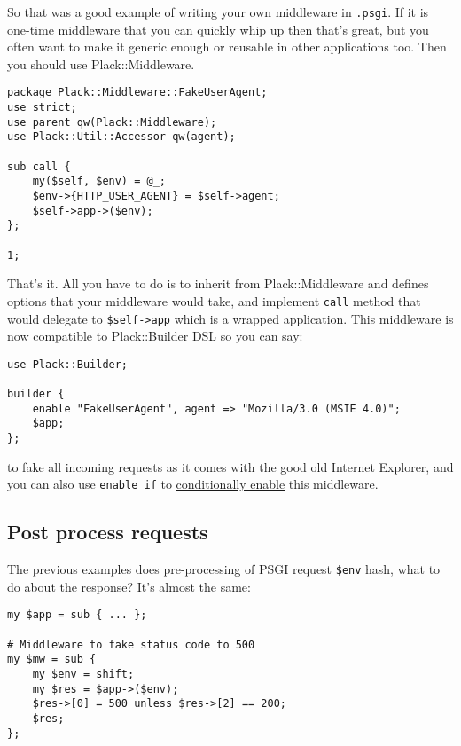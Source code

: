 So that was a good example of writing your own middleware in
\lstinline!.psgi!. If it is one-time middleware that you can quickly
whip up then that's great, but you often want to make it generic enough
or reusable in other applications too. Then you should use
Plack::Middleware.

\begin{lstlisting}
package Plack::Middleware::FakeUserAgent;
use strict;
use parent qw(Plack::Middleware);
use Plack::Util::Accessor qw(agent);

sub call {
    my($self, $env) = @_;
    $env->{HTTP_USER_AGENT} = $self->agent;
    $self->app->($env);
};

1;
\end{lstlisting}

That's it. All you have to do is to inherit from Plack::Middleware and
defines options that your middleware would take, and implement
\lstinline!call! method that would delegate to \lstinline!$self->app!
which is a wrapped application. This middleware is now compatible to
\href{http://advent.plackperl.org/2009/12/day-11-using-plackbuilder.html}{Plack::Builder
DSL} so you can say:

\begin{lstlisting}
use Plack::Builder;

builder {
    enable "FakeUserAgent", agent => "Mozilla/3.0 (MSIE 4.0)";
    $app;
};
\end{lstlisting}

to fake all incoming requests as it comes with the good old Internet
Explorer, and you can also use \lstinline!enable_if! to
\href{http://advent.plackperl.org/2009/12/day-18-load-middleware-conditionally.html}{conditionally
enable} this middleware.

\subsection{Post process requests}\label{post-process-requests}

The previous examples does pre-processing of PSGI request
\lstinline!$env! hash, what to do about the response? It's almost the
same:

\begin{lstlisting}
my $app = sub { ... };

# Middleware to fake status code to 500
my $mw = sub {
    my $env = shift;
    my $res = $app->($env);
    $res->[0] = 500 unless $res->[2] == 200;
    $res;
};
\end{lstlisting}


